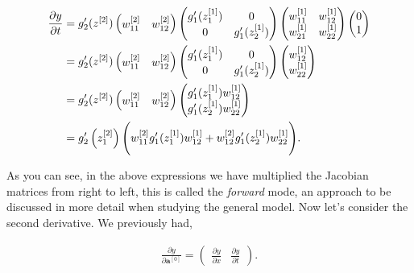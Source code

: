 \documentclass{article}
\begin{document}
\begin{align}
\frac{\partial y}{\partial t} &= g_2'(z^{[2]})
\begin{pmatrix}
w_{11}^{[2]} & w_{12}^{[2]} 
\end{pmatrix}
\begin{pmatrix}
g_1'(z_1^{[1]}) & 0 \\
0 & g_1'(z_2^{[1]})
\end{pmatrix}
\begin{pmatrix}
w_{11}^{[1]} & w_{12}^{[1]} \\
w_{21}^{[1]} & w_{22}^{[1]}
\end{pmatrix}
\begin{pmatrix}
0 \\
1
\end{pmatrix} \\
&= g_2'(z^{[2]})
\begin{pmatrix}
w_{11}^{[2]} & w_{12}^{[2]} 
\end{pmatrix}
\begin{pmatrix}
g_1'(z_1^{[1]}) & 0 \\
0 & g_1'(z_2^{[1]})
\end{pmatrix}
\begin{pmatrix}
w_{12}^{[1]}  \\
w_{22}^{[1]}
\end{pmatrix}\\
&= g_2'(z^{[2]})
\begin{pmatrix}
w_{11}^{[2]} & w_{12}^{[2]} 
\end{pmatrix}
\begin{pmatrix}
g_1'(z_1^{[1]}) w_{12}^{[1]} \\
g_1'(z_2^{[1]}) w_{22}^{[1]}
\end{pmatrix} \\
&= g_2'\left(z_1^{[2]}\right)\Bigg{(} w_{11}^{[2]} g_1'(z_1^{[1]})w_{12}^{[1]} + w_{12}^{[2]}g_1'(z_2^{[1]})w_{22}^{[1]} \Bigg{)}.
\end{align}

As you can see, in the above expressions we have multiplied the Jacobian matrices from right to left, this is called the \textit{forward} mode, an approach to be discussed in more detail when studying the general model. Now let's consider the second derivative. We previously had,

\begin{align}
\label{dydxgeneral}
\frac{\partial y}{\partial \textbf{a}^{[0]}} = 
\begin{pmatrix}
\frac{\partial y}{\partial x}  &
\frac{\partial y}{\partial t} 
\end{pmatrix}. 
\end{align}
\end{document}
